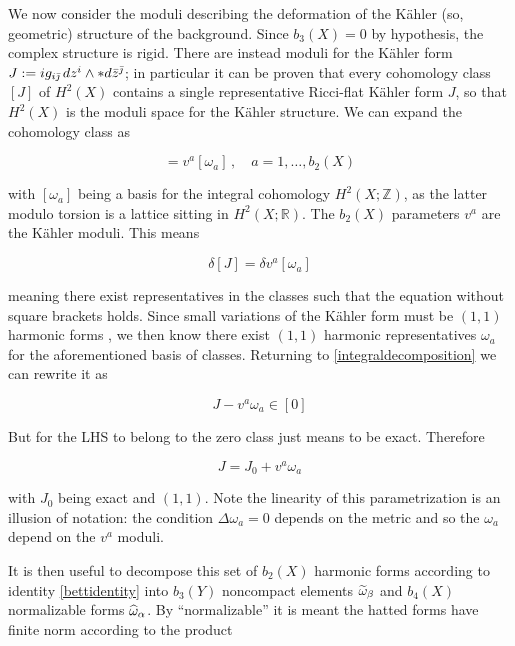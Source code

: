We now consider the moduli describing the deformation of the K\"ahler (so, geometric) structure of the background. Since $b_3(X) = 0$ by hypothesis, the complex structure is rigid. There are instead moduli for the K\"ahler form $J := i g_{i\bar{\jmath}} \,dz^i \wedge\ast d\bar z^{\bar\jmath}$; in particular it can be proven \cite{goto} that every cohomology class $[J]$ of $H^2(X)$ contains a single representative Ricci-flat K\"ahler form $J$, so that $H^2(X)$ is the moduli space for the K\"ahler structure. We can expand the cohomology class as

\begin{equation}
	[J] = v^a [\omega_a]\,,\quad a = 1,\ldots, b_2(X) \label{integraldecomposition}
\end{equation}

with $[\omega_a]$ being a basis for the integral cohomology $H^2(X;\mathbb Z)$, as the latter modulo torsion is a lattice sitting in $H^2(X;\mathbb R)$. The $b_2(X)$ parameters $v^a$ are the K\"ahler moduli. This means

\begin{equation}
	\delta [J] = \delta v^a [\omega_a]
\end{equation}

meaning there exist representatives in the classes such that the equation without square brackets holds. Since small variations of the K\"ahler form must be $(1,1)$ harmonic forms \cite{CANDELAScy}, we then know there exist $(1,1)$ harmonic representatives $\omega_a$ for the aforementioned basis of classes. Returning to \eqref{integraldecomposition} we can rewrite it as

\begin{equation}
	J - v^a \omega_a \in [0]
\end{equation}

But for the LHS to belong to the zero class just means to be exact. Therefore

\begin{equation}
	J = J_0 + v^a \omega_a \label{JandJ0}
\end{equation}

with $J_0$ being exact and $(1,1)$. Note the linearity of this parametrization is an illusion of notation: the condition $\Delta \omega_a = 0$ depends on the metric and so the $\omega_a$ depend on the $v^a$ moduli.

It is then useful to decompose this set of $b_2(X)$ harmonic forms according to identity \eqref{bettidentity} into $b_3(Y)$ noncompact elements $\widetilde{\omega}_\beta$ and $b_4(X)$ normalizable forms $\widehat{\omega}_\alpha$. By ``normalizable'' it is meant the hatted forms have finite norm according to the product

